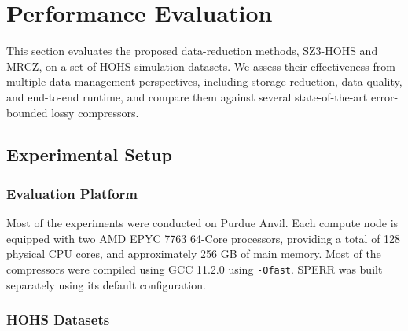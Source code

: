 \section{Performance Evaluation}\label{sec:performance evaluation}

This section evaluates the proposed data-reduction methods, SZ3-HOHS and MRCZ, on a set of HOHS simulation datasets. We assess their effectiveness from multiple data-management perspectives, including storage reduction, data quality, and end-to-end runtime, and compare them against several state-of-the-art error-bounded lossy compressors.

\subsection{Experimental Setup}\label{sec:performance evaluation:setup}

\subsubsection{Evaluation Platform}\mbox{}

Most of the experiments were conducted on Purdue Anvil. Each compute node is equipped with two AMD EPYC 7763 64-Core processors, providing a total of 128 physical CPU cores, and approximately 256 GB of main memory.
Most of the compressors were compiled using GCC 11.2.0 using \verb|-Ofast|. SPERR was built separately using its default configuration.

\subsubsection{HOHS Datasets}\mbox{}

